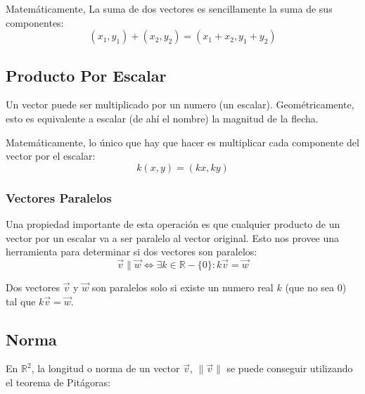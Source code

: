 \documentclass[../teoria.root.tex]{subfiles}
\begin{document}
Matemáticamente, La suma de dos vectores es sencillamente la suma de sus
componentes:
\[(x_1,y_1)+(x_2,y_2)=(x_1+x_2,y_1+y_2)\]

\subsection{Producto Por Escalar}

Un vector puede ser multiplicado por un numero (un escalar). Geométricamente,
esto es equivalente a escalar (de ahí el nombre) la magnitud de la flecha.
\begin{center}
\end{center}

Matemáticamente, lo único que hay que hacer es multiplicar cada componente del
vector por el escalar:
\[k(x,y)=(kx,ky)\]

\subsubsection{Vectores Paralelos}

Una propiedad importante de esta operación es que cualquier producto de un
vector por un escalar va a ser paralelo al vector original. Esto nos provee una
herramienta para determinar si dos vectores son paralelos:
\[\vec{v}\parallel\vec{w}\iff\exists k\in\mathbb{R}-\{0\}:k\vec{v}=\vec{w}\]

Dos vectores $\vec{v}$ y $\vec{w}$ son paralelos solo si existe un numero real
$k$ (que no sea $0$) tal que $k\vec{v}=\vec{w}$.

\subsection{Norma}

En $\mathbb{R}^2$, la longitud o norma de un vector $\vec{v}$, $\|\vec{v}\|$ se
puede conseguir utilizando el teorema de Pitágoras:
\begin{center}
\end{center}
\end{document}
